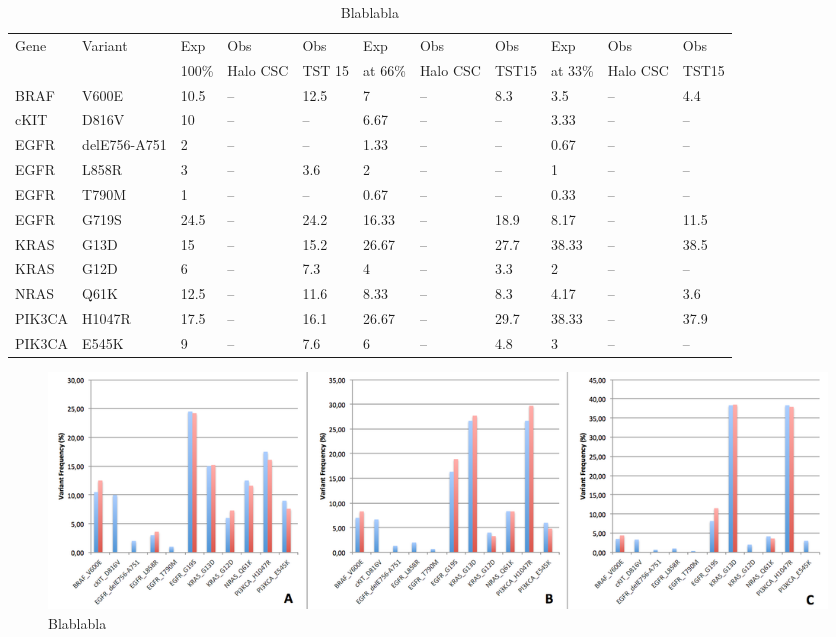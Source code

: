 \begin{table}
  \caption[sensitivity_analysis]{Blablabla}
  \centering
    \begin{tabular}{| p{1.2cm} | p{1.5cm} | p{1cm}| p{1cm}| p{1cm}| p{1cm}| p{1cm}| p{1cm}| p{1cm}| p{1cm}| p{1cm} |}
    \hline
    Gene & Variant & Exp &  Obs &  Obs & Exp &  Obs & Obs & Exp & Obs & Obs \\
         &         & 100\% &  Halo CSC &  TST 15   & at 66\%  &  Halo CSC & TST15    & at 33\%  & Halo CSC & TST15 \\
    \hline \hline
    BRAF & V600E        & 10.5  & -- & 12.5 & 7     & -- & 8.3  & 3.5   & -- & 4.4 \\
    cKIT & D816V        & 10    & -- & --   & 6.67  & -- & --   & 3.33  & -- & -- \\
    EGFR & delE756-A751 & 2     & -- & --   & 1.33  & -- & --   & 0.67  & -- & -- \\
    EGFR & L858R        & 3     & -- & 3.6  & 2     & -- & --   & 1     & -- & -- \\
    EGFR & T790M        & 1     & -- & --   & 0.67  & -- & --   & 0.33  & -- & -- \\
    EGFR & G719S        & 24.5  & -- & 24.2 & 16.33 & -- & 18.9 & 8.17  & -- & 11.5 \\
    KRAS & G13D         & 15    & -- & 15.2 & 26.67 & -- & 27.7 & 38.33 & -- & 38.5 \\
    KRAS & G12D         & 6     & -- & 7.3  & 4     & -- & 3.3  & 2     & -- & -- \\
    NRAS & Q61K         & 12.5  & -- & 11.6 & 8.33  & -- & 8.3  & 4.17  & -- & 3.6 \\
    PIK3CA & H1047R     & 17.5  & -- & 16.1 & 26.67 & -- & 29.7 & 38.33 & -- & 37.9 \\
    PIK3CA & E545K      & 9     & -- & 7.6  & 6     & -- & 4.8  & 3     & -- & -- \\
    \hline
    \end{tabular}
\end{table}

\begin{figure}[!htbp]
  \begin{center}
    \includegraphics[scale=0.5,angle=0]{var_freqs.png}
    \caption{Blablabla}
    \label{Fig:var_freqs}
  \end{center}
\end{figure}

